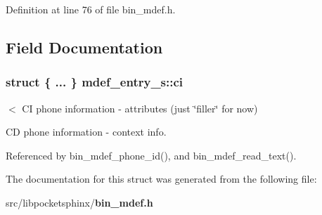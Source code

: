 Definition at line 76 of file bin\-\_\-mdef.\-h.



\subsection{Field Documentation}
\subsubsection[{ci}]{\setlength{\rightskip}{0pt plus 5cm}struct \{ ... \}   mdef\-\_\-entry\-\_\-s\-::ci}\label{structmdef__entry__s_a24e5db7af5e705b310e82154055043ec}


$<$ C\-I phone information -\/ attributes (just \char`\"{}filler\char`\"{} for now) 

C\-D phone information -\/ context info. 

Referenced by bin\-\_\-mdef\-\_\-phone\-\_\-id(), and bin\-\_\-mdef\-\_\-read\-\_\-text().



The documentation for this struct was generated from the following file\-:\begin{DoxyCompactItemize}
\item 
src/libpocketsphinx/{\bf bin\-\_\-mdef.\-h}\end{DoxyCompactItemize}
